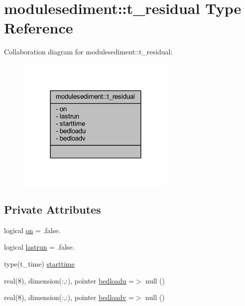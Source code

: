 \hypertarget{structmodulesediment_1_1t__residual}{}\section{modulesediment\+:\+:t\+\_\+residual Type Reference}
\label{structmodulesediment_1_1t__residual}


Collaboration diagram for modulesediment\+:\+:t\+\_\+residual\+:\nopagebreak
\begin{figure}[H]
\begin{center}
\leavevmode
\includegraphics[width=216pt]{structmodulesediment_1_1t__residual__coll__graph}
\end{center}
\end{figure}
\subsection*{Private Attributes}
\begin{DoxyCompactItemize}
\item 
logical \mbox{\hyperlink{structmodulesediment_1_1t__residual_adbf01e0942f04b240c04847614c1da96}{on}} = .false.
\item 
logical \mbox{\hyperlink{structmodulesediment_1_1t__residual_aaf4336f8eb41b66f75da376087a3e5bc}{lastrun}} = .false.
\item 
type(t\+\_\+time) \mbox{\hyperlink{structmodulesediment_1_1t__residual_af498bd14badc046aa1127017f0e13dec}{starttime}}
\item 
real(8), dimension(\+:,\+:), pointer \mbox{\hyperlink{structmodulesediment_1_1t__residual_a23f71ee494992e1e4edcf88fa814e354}{bedloadu}} =$>$ null ()
\item 
real(8), dimension(\+:,\+:), pointer \mbox{\hyperlink{structmodulesediment_1_1t__residual_a9097ab2585ae13c43659079aae37855e}{bedloadv}} =$>$ null ()
\end{DoxyCompactItemize}



